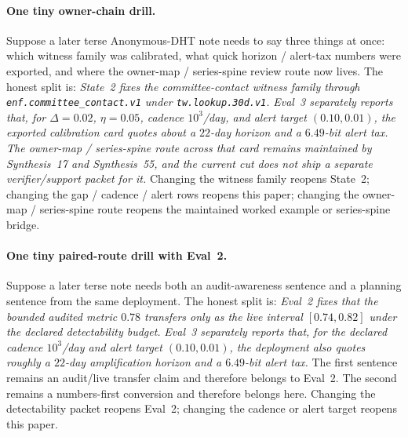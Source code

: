 \documentclass[11pt]{article}
\begin{document}
\paragraph{One tiny owner-chain drill.}
Suppose a later terse Anonymous-DHT note needs to say three things at once: which witness family was calibrated, what quick horizon / alert-tax numbers were exported, and where the owner-map / series-spine review route now lives.
The honest split is: \emph{State~2 fixes the committee-contact witness family through \texttt{enf.committee\_contact.v1} under \texttt{tw.lookup.30d.v1}.} \emph{Eval~3 separately reports that, for $\Delta=0.02$, $\eta=0.05$, cadence $10^3$/day, and alert target $(0.10,0.01)$, the exported calibration card quotes about a $22$-day horizon and a $6.49$-bit alert tax.} \emph{The owner-map / series-spine route across that card remains maintained by Synthesis~17 and Synthesis~55, and the current cut does not ship a separate verifier/support packet for it.}
Changing the witness family reopens State~2; changing the gap / cadence / alert rows reopens this paper; changing the owner-map / series-spine route reopens the maintained worked example or series-spine bridge.\cite{state2,series:workedexample,series:seriesspines}

\paragraph{One tiny paired-route drill with Eval~2.}
Suppose a later terse note needs both an audit-awareness sentence and a planning sentence from the same deployment.
The honest split is: \emph{Eval~2 fixes that the bounded audited metric $0.78$ transfers only as the live interval $[0.74,0.82]$ under the declared detectability budget.} \emph{Eval~3 separately reports that, for the declared cadence $10^3$/day and alert target $(0.10,0.01)$, the deployment also quotes roughly a $22$-day amplification horizon and a $6.49$-bit alert tax.}
The first sentence remains an audit/live transfer claim and therefore belongs to Eval~2.
The second remains a numbers-first conversion and therefore belongs here.
Changing the detectability packet reopens Eval~2; changing the cadence or alert target reopens this paper.
\end{document}
